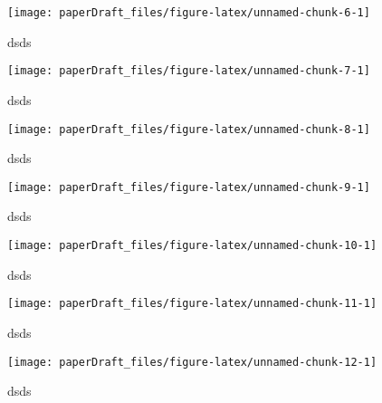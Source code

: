 \documentclass[
  10pt,
  dvipsnames,enabledeprecatedfontcommands]{scrartcl}
\begin{document}
\begin{figure}[H]


\begin{center}\texttt{[image: paperDraft\_files/figure-latex/unnamed-chunk-6-1]} \end{center}
\caption{dsds}
\label{fig:weat1reddit}
\end{figure}

\begin{figure}[H]


\begin{center}\texttt{[image: paperDraft\_files/figure-latex/unnamed-chunk-7-1]} \end{center}
\caption{dsds}
\label{fig:religionGoogle}
\end{figure}

\begin{figure}[H]


\begin{center}\texttt{[image: paperDraft\_files/figure-latex/unnamed-chunk-8-1]} \end{center}
\caption{dsds}
\label{fig:religionGlove}
\end{figure}

\begin{figure}[H]


\begin{center}\texttt{[image: paperDraft\_files/figure-latex/unnamed-chunk-9-1]} \end{center}
\caption{dsds}
\label{fig:religionReddit}
\end{figure}

\begin{figure}[H]


\begin{center}\texttt{[image: paperDraft\_files/figure-latex/unnamed-chunk-10-1]} \end{center}
\caption{dsds}
\label{fig:raceGoogle}
\end{figure}

\begin{figure}[H]


\begin{center}\texttt{[image: paperDraft\_files/figure-latex/unnamed-chunk-11-1]} \end{center}
\caption{dsds}
\label{fig:raceGlove}
\end{figure}

\begin{figure}[H]


\begin{center}\texttt{[image: paperDraft\_files/figure-latex/unnamed-chunk-12-1]} \end{center}
\caption{dsds}
\label{fig:raceReddit}
\end{figure}
\end{document}
